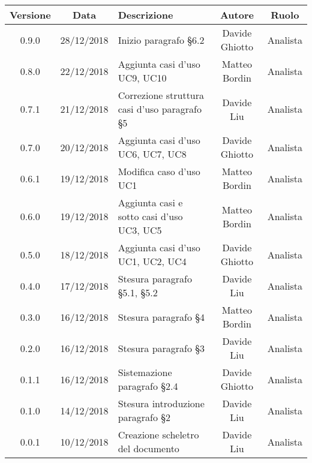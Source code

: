 \begin{table}[!htbp] %
            \centering
            \renewcommand{\arraystretch}{2}
            \begin{tabular}{|c|c|p{5cm}|c|c|} %
                \rowcolor{orange!50} %
        		\hline
        		\textbf{Versione} & \textbf{Data} & \textbf{Descrizione} & \textbf{Autore} & \textbf{Ruolo} \\
                \hline
                0.9.0 & 28/12/2018 & Inizio paragrafo §6.2 & Davide Ghiotto & Analista \\
                \hline
                0.8.0 & 22/12/2018 & Aggiunta casi d’uso UC9, UC10 & Matteo Bordin & Analista \\
                \hline
                0.7.1 & 21/12/2018 & Correzione struttura casi d’uso paragrafo §5 & Davide Liu & Analista \\
                \hline
                0.7.0 & 20/12/2018 & Aggiunta casi d’uso UC6, UC7, UC8 & Davide Ghiotto & Analista \\
                \hline
                0.6.1 & 19/12/2018 & Modifica caso d’uso UC1 & Matteo Bordin & Analista \\
                \hline
                0.6.0 & 19/12/2018 & Aggiunta casi e sotto casi d’uso UC3, UC5 & Matteo Bordin & Analista \\
                \hline
                0.5.0 & 18/12/2018 & Aggiunta casi d’uso UC1, UC2, UC4 & Davide Ghiotto & Analista \\
                \hline
                0.4.0 & 17/12/2018 & Stesura paragrafo §5.1, §5.2 & Davide Liu & Analista \\
                \hline
                0.3.0 & 16/12/2018 & Stesura paragrafo §4 & Matteo Bordin & Analista \\
                \hline
                0.2.0 & 16/12/2018 & Stesura paragrafo §3 & Davide Liu & Analista \\
                \hline
                0.1.1 & 16/12/2018 & Sistemazione  paragrafo §2.4 & Davide Ghiotto & Analista \\
                \hline 
                0.1.0 & 14/12/2018 & Stesura introduzione paragrafo §2 & Davide Liu & Analista \\
                \hline
                0.0.1 & 10/12/2018 & Creazione scheletro del documento & Davide Liu & Analista \\
                \hline
        \end{tabular}
\end{table}
